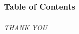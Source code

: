 \documentclass[12pt,aspectratio=169]{beamer}
\begin{document}
	
\begin{frame}
	\frametitle{Table of Contents}
	\tableofcontents
\end{frame}







\begin{frame}
	\frametitle{}
	\centering \Large
	\emph{THANK YOU}
\end{frame}
\end{document}
